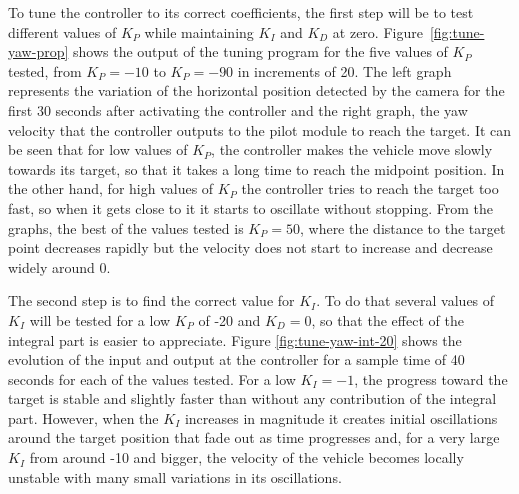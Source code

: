 To tune the controller to its correct coefficients, the first step will be to test different values of $K_{P}$ while maintaining $K_{I}$ and $K_{D}$ at zero.
Figure~\ref{fig:tune-yaw-prop} shows the output of the tuning program for the five values of $K_{P}$ tested, from $K_P=-10$ to $K_P=-90$ in increments of 20.
The left graph represents the variation of the horizontal position detected by the camera for the first 30 seconds after activating the controller and the right graph, the yaw velocity that the controller outputs to the pilot module to reach the target.
It can be seen that for low values of $K_{P}$, the controller makes the vehicle move slowly towards its target, so that it takes a long time to reach the midpoint position.
In the other hand, for high values of $K_{P}$ the controller tries to reach the target too fast, so when it gets close to it it starts to oscillate without stopping.
From the graphs, the best of the values tested is $K_{P}=50$, where the distance to the target point decreases rapidly but the velocity does not start to increase and decrease widely around 0.

The second step is to find the correct value for $K_I$. To do that several values of $K_I$ will be tested for a low $K_P$ of -20 and $K_D=0$, so that the effect of the integral part is easier to appreciate. Figure \ref{fig:tune-yaw-int-20} shows the evolution of the input and output at the controller for a sample time of 40 seconds for each of the values tested. 
For a low $K_I=-1$, the progress toward the target is stable and slightly faster than without any contribution of the integral part.
However, when the $K_I$ increases in magnitude it creates initial oscillations around the target position that fade out as time progresses and, for a very large $K_I$ from around -10 and bigger, the velocity of the vehicle becomes locally unstable with many small variations in its oscillations.

